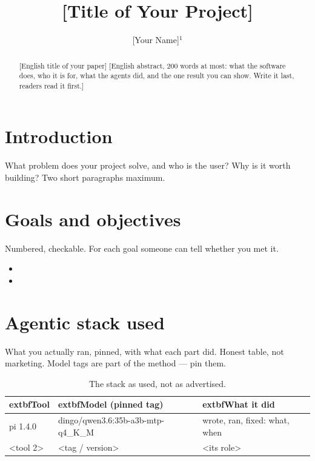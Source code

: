 \documentclass[a4paper]{article}
\begin{document}
\title{[Title of Your Project]}

\author{[Your Name]$^{1}$}



\maketitle

\begin{abstract}{[English title of your paper]}
[English abstract, 200 words at most: what the software does, who it is for,
what the agents did, and the one result you can show. Write it last, readers
read it first.]
\end{abstract}

\section{Introduction}
What problem does your project solve, and who is the user? Why is it worth
building? Two short paragraphs maximum.

\section{Goals and objectives}
Numbered, checkable. For each goal someone can tell whether you met it.
\begin{itemize}
\item[G1.] [Goal one --- phrased so a reader can test it]
\item[G2.] [Goal two]
\end{itemize}

\section{Agentic stack used}
What you actually ran, pinned, with what each part did. Honest table, not
marketing. Model tags are part of the method --- pin them.

\begin{table}[h]
\centering\small
\begin{center}
\begin{tabular}{ | l | l | l | }
\hline 
  	extbf{Tool} & 	extbf{Model (pinned tag)} & 	extbf{What it did}\\
\hline
  pi 1.4.0 & dingo/qwen3.6:35b-a3b-mtp-q4\_K\_M & wrote, ran, fixed: what, when \\
  <tool 2> & <tag / version> & <its role> \\
\hline
\end{tabular}
\end{center}
\caption{The stack as used, not as advertised.}
\end{table}
\end{document}
